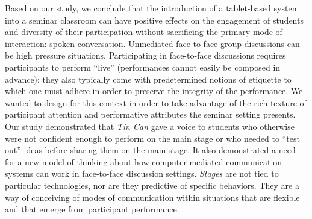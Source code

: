 Based on our study, we conclude that the introduction of a tablet-based system into a seminar classroom can have positive effects on the engagement of students and diversity of their participation without sacrificing the primary mode of interaction: spoken conversation.  Unmediated face-to-face group discussions can be high pressure situations.  Participating in face-to-face discussions requires participants to perform ``live'' (performances cannot easily be composed in advance); they also typically come with predetermined notions of etiquette to which one must adhere in order to preserve the integrity of the performance. We wanted to design for this context in order to take advantage of the rich texture of participant attention and performative attributes the seminar setting presents. Our study demonstrated that \emph{Tin Can} gave a voice to students who otherwise were not confident enough to perform on the main stage or who needed to ``test out'' ideas before sharing them on the main stage. It also demonstrated a need for a new model of thinking about how computer mediated communication systems can work in face-to-face discussion settings.  \emph{Stages} are not tied to particular technologies, nor are they predictive of specific behaviors.  They are a way of conceiving of modes of communication within situations that are flexible and that emerge from participant performance.  



